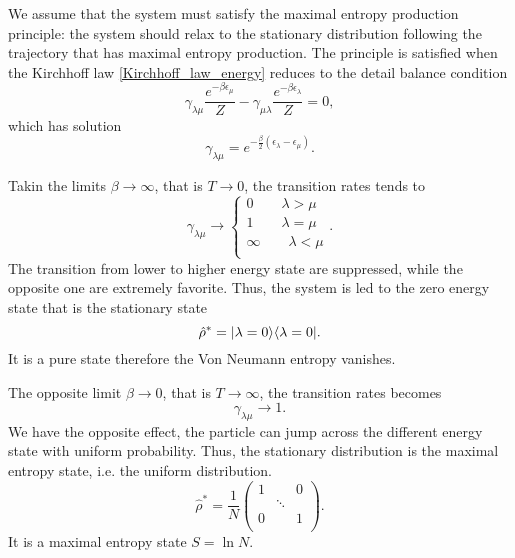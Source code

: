 We assume that the system must satisfy the maximal entropy production principle: the system should relax to the stationary distribution following the trajectory that has maximal entropy production. The principle is satisfied when the Kirchhoff law \eqref{Kirchhoff_law_energy} reduces to the detail balance condition
\begin{equation}
    \gamma_{\lambda\mu}\frac{e^{-\beta \epsilon_\mu}}{Z} - \gamma_{\mu\lambda}\frac{e^{-\beta \epsilon_\lambda}}{Z} = 0,
\end{equation}
which has solution
\begin{equation}\label{gamma_detailed_balance}
    \gamma_{\lambda\mu} = e^{-\frac{\beta}{2}\left(\epsilon_\lambda - \epsilon_\mu\right)}.
\end{equation}

Takin the limits $\beta \rightarrow \infty$, that is $T  \rightarrow 0$, the transition rates tends to
\begin{equation}
    \gamma_{\lambda\mu} \rightarrow \left\{\begin{aligned}
        0 \qquad \lambda > \mu\\
        1 \qquad \lambda = \mu\\
        \infty \qquad  \lambda < \mu \\
    \end{aligned}\right. . 
\end{equation}
The transition from lower to higher energy state are suppressed, while the opposite one are extremely favorite. Thus, the system is led to the zero energy state that is the stationary state
\begin{equation}\label{beta_inf_stationary_distribution}
    \hat\rho^* = \lvert\lambda = 0\rangle\langle\lambda = 0\rvert.
\end{equation} 
It is a pure state therefore the Von Neumann entropy vanishes.

The opposite limit $\beta \rightarrow 0$, that is $T \rightarrow \infty$, the transition rates becomes
\begin{equation}
    \gamma_{\lambda\mu} \rightarrow 1.
\end{equation}
We have the opposite effect, the particle can jump across the different energy state with uniform probability. Thus, the stationary distribution is the maximal entropy state, i.e. the uniform distribution.
\begin{equation}
    \hat\rho^* = \frac{1}{N}\begin{pmatrix}
        1&&0\\
        &\ddots&\\
        0&&1\\
    \end{pmatrix}.
\end{equation}
It is a maximal entropy state $S = \ln N$.

